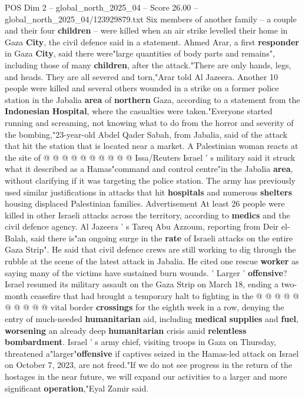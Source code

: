 \begin{textsample}{POS Dim 2 – global\_north\_2025\_04 – Score 26.00 – global\_north\_2025\_04/123929879.txt}  \label{ex:f2_pos_329}
Six members of another family -- a couple and their four \textbf{children} -- were killed when an air strike levelled their home in Gaza \textbf{City}, the civil defence said in a statement.
Ahmed Arar, a first \textbf{responder} in Gaza \textbf{City}, said there were"large quantities of body parts and remains", including those of many \textbf{children}, after the attack."There are only hands, legs, and heads.
They are all severed and torn,"Arar told Al Jazeera.
Another 10 people were killed and several others wounded in a strike on a former police station in the Jabalia \textbf{area} of \textbf{northern} Gaza, according to a statement from the \textbf{Indonesian} \textbf{Hospital}, where the casualties were taken."Everyone started running and screaming, not knowing what to do from the horror and severity of the bombing,"23-year-old Abdel Qader Sabah, from Jabalia, said of the attack that hit the station that is located near a market.
A Palestinian woman reacts at the site of @ @ @ @ @ @ @ @ @ @ Issa/Reuters Israel ' s military said it struck what it described as a Hamas"command and control centre"in the Jabalia \textbf{area}, without clarifying if it was targeting the police station.
The army has previously used similar justifications in attacks that hit \textbf{hospitals} and numerous \textbf{shelters} housing displaced Palestinian families.
Advertisement At least 26 people were killed in other Israeli attacks across the territory, according to \textbf{medics} and the civil defence agency.
Al Jazeera ' s Tareq Abu Azzoum, reporting from Deir el-Balah, said there is"an ongoing surge in the \textbf{rate} of Israeli attacks on the entire Gaza Strip".
He said that civil defence crews are still working to dig through the rubble at the scene of the latest attack in Jabalia.
He cited one rescue \textbf{worker} as saying many of the victims have sustained burn wounds. ' Larger ' \textbf{offensive}?
Israel resumed its military assault on the Gaza Strip on March 18, ending a two-month ceasefire that had brought a temporary halt to fighting in the @ @ @ @ @ @ @ @ @ @ vital border \textbf{crossings} for the eighth week in a row, denying the entry of much-needed \textbf{humanitarian} aid, including \textbf{medical} \textbf{supplies} and \textbf{fuel}, \textbf{worsening} an already deep \textbf{humanitarian} crisis amid \textbf{relentless} \textbf{bombardment}.
Israel ' s army chief, visiting troops in Gaza on Thursday, threatened a"larger"\textbf{offensive} if captives seized in the Hamas-led attack on Israel on October 7, 2023, are not freed."If we do not see progress in the return of the hostages in the near future, we will expand our activities to a larger and more significant \textbf{operation},"Eyal Zamir said.

\end{textsample}
